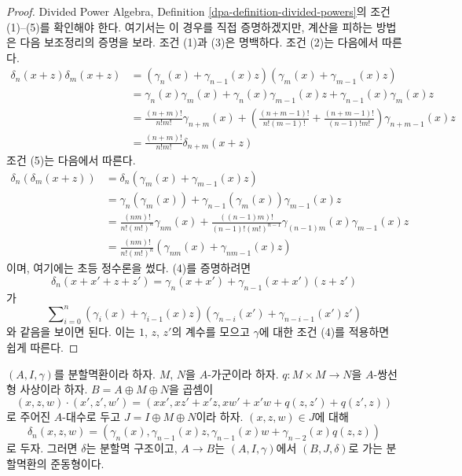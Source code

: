 \begin{proof}
Divided Power Algebra, Definition \ref{dpa-definition-divided-powers}의
조건 (1)--(5)를 확인해야 한다. 여기서는 이 경우를 직접 증명하겠지만,
계산을 피하는 방법은 다음 보조정리의 증명을 보라.
조건 (1)과 (3)은 명백하다. 조건 (2)는 다음에서 따른다.
\begin{align*}
\delta_n(x + z)\delta_m(x + z)
& =
(\gamma_n(x) + \gamma_{n - 1}(x)z)(\gamma_m(x) + \gamma_{m - 1}(x)z) \\
& = \gamma_n(x)\gamma_m(x) + \gamma_n(x)\gamma_{m - 1}(x)z +
\gamma_{n - 1}(x)\gamma_m(x)z \\
& =
\frac{(n + m)!}{n!m!} \gamma_{n + m}(x) +
\left(\frac{(n + m - 1)!}{n!(m - 1)!} +
\frac{(n + m - 1)!}{(n - 1)!m!}\right)
\gamma_{n + m - 1}(x) z \\
& =
\frac{(n + m)!}{n!m!}\delta_{n + m}(x + z)
\end{align*}
조건 (5)는 다음에서 따른다.
\begin{align*}
\delta_n(\delta_m(x + z))
& =
\delta_n(\gamma_m(x) + \gamma_{m - 1}(x)z) \\
& =
\gamma_n(\gamma_m(x)) + \gamma_{n - 1}(\gamma_m(x))\gamma_{m - 1}(x)z \\
& =
\frac{(nm)!}{n! (m!)^n} \gamma_{nm}(x) +
\frac{((n - 1)m)!}{(n - 1)! (m!)^{n - 1}}
\gamma_{(n - 1)m}(x) \gamma_{m - 1}(x) z \\
& = \frac{(nm)!}{n! (m!)^n}(\gamma_{nm}(x) + \gamma_{nm - 1}(x) z)
\end{align*}
이며, 여기에는 초등 정수론을 썼다. (4)를 증명하려면
$$
\delta_n(x + x' + z + z')
=
\gamma_n(x + x') + \gamma_{n - 1}(x + x')(z + z')
$$
가
$$
\sum\nolimits_{i = 0}^n
(\gamma_i(x) + \gamma_{i - 1}(x)z)
(\gamma_{n - i}(x') + \gamma_{n - i - 1}(x')z')
$$
와 같음을 보이면 된다. 이는 $1$, $z$, $z'$의 계수를 모으고
$\gamma$에 대한 조건 (4)를 적용하면 쉽게 따른다.
\end{proof}


\begin{lemma}
\label{lemma-divided-power-second-order-thickening}
$(A, I, \gamma)$를 분할멱환이라 하자. $M$, $N$을 $A$-가군이라 하자.
$q : M \times M \to N$을 $A$-쌍선형 사상이라 하자.
$B = A \oplus M \oplus N$을 곱셈이
$$
(x, z, w)\cdot (x', z', w') = (xx', xz' + x'z, xw' + x'w + q(z, z') + q(z', z))
$$
로 주어진 $A$-대수로 두고 $J = I \oplus M \oplus N$이라 하자.
$(x, z, w) \in J$에 대해
$$
\delta_n(x, z, w) = (\gamma_n(x), \gamma_{n - 1}(x)z,
\gamma_{n - 1}(x)w + \gamma_{n - 2}(x)q(z, z))
$$
로 두자. 그러면 $\delta$는 분할멱 구조이고,
$A \to B$는 $(A, I, \gamma)$에서 $(B, J, \delta)$로 가는
분할멱환의 준동형이다.
\end{lemma}


